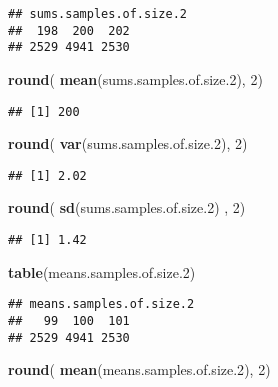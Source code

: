 \documentclass[]{book}
\newenvironment{Shaded}{\begin{snugshade}}{\end{snugshade}}
\newcommand{\DecValTok}[1]{\textcolor[rgb]{0.00,0.00,0.81}{#1}}
\newcommand{\FloatTok}[1]{\textcolor[rgb]{0.00,0.00,0.81}{#1}}
\newcommand{\KeywordTok}[1]{\textcolor[rgb]{0.13,0.29,0.53}{\textbf{#1}}}
\newcommand{\NormalTok}[1]{#1}
\begin{document}
\begin{verbatim}
## sums.samples.of.size.2
##  198  200  202 
## 2529 4941 2530
\end{verbatim}

\begin{Shaded}
\begin{Highlighting}[]
\KeywordTok{round}\NormalTok{( }\KeywordTok{mean}\NormalTok{(sums.samples.of.size}\FloatTok{.2}\NormalTok{), }\DecValTok{2}\NormalTok{)}
\end{Highlighting}
\end{Shaded}

\begin{verbatim}
## [1] 200
\end{verbatim}

\begin{Shaded}
\begin{Highlighting}[]
\KeywordTok{round}\NormalTok{( }\KeywordTok{var}\NormalTok{(sums.samples.of.size}\FloatTok{.2}\NormalTok{), }\DecValTok{2}\NormalTok{)}
\end{Highlighting}
\end{Shaded}

\begin{verbatim}
## [1] 2.02
\end{verbatim}

\begin{Shaded}
\begin{Highlighting}[]
\KeywordTok{round}\NormalTok{( }\KeywordTok{sd}\NormalTok{(sums.samples.of.size}\FloatTok{.2}\NormalTok{) , }\DecValTok{2}\NormalTok{)}
\end{Highlighting}
\end{Shaded}

\begin{verbatim}
## [1] 1.42
\end{verbatim}

\begin{Shaded}
\begin{Highlighting}[]
\KeywordTok{table}\NormalTok{(means.samples.of.size}\FloatTok{.2}\NormalTok{)}
\end{Highlighting}
\end{Shaded}

\begin{verbatim}
## means.samples.of.size.2
##   99  100  101 
## 2529 4941 2530
\end{verbatim}

\begin{Shaded}
\begin{Highlighting}[]
\KeywordTok{round}\NormalTok{( }\KeywordTok{mean}\NormalTok{(means.samples.of.size}\FloatTok{.2}\NormalTok{), }\DecValTok{2}\NormalTok{)}
\end{Highlighting}
\end{Shaded}
\end{document}

